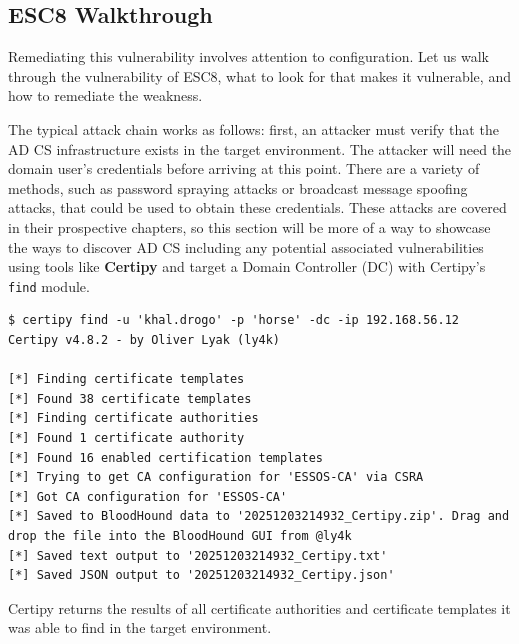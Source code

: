 \subsection{ESC8 Walkthrough}
Remediating this vulnerability involves attention to configuration. Let us walk through the vulnerability of ESC8, what to look for that makes it vulnerable, and how to remediate the weakness.

The typical attack chain works as follows: first, an attacker must verify that the AD CS infrastructure exists in the target environment. The attacker will need the domain user's credentials before arriving at this point. There are a variety of methods, such as password spraying attacks or broadcast message spoofing attacks, that could be used to obtain these credentials. These attacks are covered in their prospective chapters, so this section will be more of a way to showcase the ways to discover AD CS including any potential associated vulnerabilities using tools like \textbf{Certipy} and target a Domain Controller (DC) with Certipy's \texttt{find} module.

\begin{notebox}
\begin{verbatim}
$ certipy find -u 'khal.drogo' -p 'horse' -dc -ip 192.168.56.12
Certipy v4.8.2 - by Oliver Lyak (ly4k)

[*] Finding certificate templates
[*] Found 38 certificate templates
[*] Finding certificate authorities
[*] Found 1 certificate authority
[*] Found 16 enabled certification templates
[*] Trying to get CA configuration for 'ESSOS-CA' via CSRA
[*] Got CA configuration for 'ESSOS-CA'
[*] Saved to BloodHound data to '20251203214932_Certipy.zip'. Drag and drop the file into the BloodHound GUI from @ly4k
[*] Saved text output to '20251203214932_Certipy.txt'
[*] Saved JSON output to '20251203214932_Certipy.json'
\end{verbatim}
\end{notebox}

Certipy returns the results of all certificate authorities and certificate templates it was able to find in the target environment.

